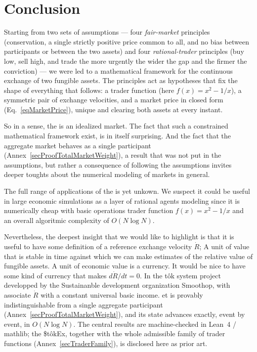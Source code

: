\documentclass[letterpaper]{article}
\newcommand{\StokEx}{\$t\^{o}kEx}
\begin{document}
\section{Conclusion}

Starting from two sets of assumptions --- four \emph{fair-market} principles (conservation, a single strictly positive price common to all,
and no bias between participants or between the two assets) and four \emph{rational-trader} principles
(buy low, sell high, and trade the more urgently the wider the gap and the firmer the conviction) ---
we were led to a mathematical framework for the continuous exchange of two fungible assets.
The principles act as hypotheses that fix the shape of everything that follows: a trader function (here $f(x) = x^2 - 1/x$),
a symmetric pair of exchange velocities, and a market price in closed form (Eq.~\eqref{eqMarketPrice}),
unique and clearing both assets at every instant.

So in a sense, the \stokex is an idealized market. The fact that such a constrained mathematical framework exist, is in itself surprising.
And the fact that the aggregate market behaves as a single participant (Annex~\ref{secProofTotalMarketWeight}), a result that was not put in the assumptions, but rather a consequence of following the assumptions invites deeper toughts about the numerical modeling of markets in general.

The full range of applications of the \stokex is yet unkown.
We suspect it could be useful in large economic simulations as a layer of rational agents modeling since it is numerically cheap with basic operations trader function $f(x) = x^2 - 1/x$ and an overall algoritmic complexity of $O(N \log N)$.

Nevertheless, the deepest insight that we would like to highlight is that it is useful to have some definition of a reference exchange velocity $\dot{R}$; A unit of value that is stable in time against which we can make estimates of the relative value of fungible assets.
A unit of economic value is a currency. It would be nice to have some kind of currency that makes $d\dot{R}/dt = 0$. In the tôk system project developped by the Sustainanble development organization Smoothop, with associate $\dot{R}$ with a constant universal basic income.
et is provably indistinguishable from a single aggregate participant (Annex~\ref{secProofTotalMarketWeight}), and its state advances exactly, event by event, in $O(N \log N)$. The central results are machine-checked in Lean~4 / mathlib; the \StokEx{}, together with the whole admissible family of trader functions (Annex~\ref{secTraderFamily}), is disclosed here as prior art.
\end{document}
